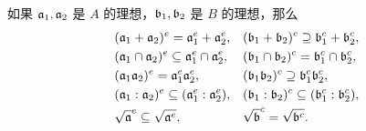 \begin{proposition}\label{prop:rule of extension and contraction}
  如果 $\mathfrak{a}_1,\mathfrak{a}_2$ 是 $A$ 的理想，$\mathfrak{b}_1,\mathfrak{b}_2$ 是 $B$
  的理想，那么
  \begin{align*}
    &(\mathfrak{a}_1+\mathfrak{a}_2)^e=\mathfrak{a}_1^e+\mathfrak{a}_2^e ,
    & &(\mathfrak{b}_1+\mathfrak{b}_2)^c\supseteq \mathfrak{b}_1^c+\mathfrak{b}_2^c,\\
    &(\mathfrak{a}_1\cap\mathfrak{a}_2)^e\subseteq\mathfrak{a}_1^e\cap\mathfrak{a}_2^e,
    &&(\mathfrak{b}_1\cap\mathfrak{b}_2)^c=\mathfrak{b}_1^c\cap\mathfrak{b}_2^c,\\
    &(\mathfrak{a}_1\mathfrak{a}_2)^e=\mathfrak{a}_1^e\mathfrak{a}_2^e,
    &&(\mathfrak{b}_1\mathfrak{b}_2)^c\supseteq\mathfrak{b}_1^c\mathfrak{b}_2^c,\\
    &(\mathfrak{a}_1:\mathfrak{a}_2)^e\subseteq(\mathfrak{a}_1^e:\mathfrak{a}_2^e),
    &&(\mathfrak{b}_1:\mathfrak{b}_2)^c\subseteq (\mathfrak{b}_1^c:\mathfrak{b}_2^c), \\
    &\sqrt{\mathfrak{a}}^e\subseteq\sqrt{\mathfrak{a}^e},
    &&\sqrt{\mathfrak{b}}^c=\sqrt{\mathfrak{b}^c}.
  \end{align*}
\end{proposition}
